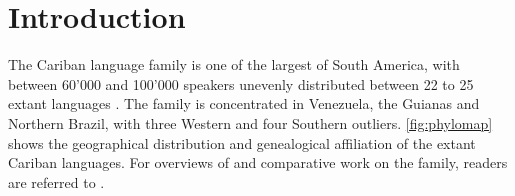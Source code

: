 \section{Introduction}
\label{sec:intro}
The Cariban language family is one of the largest of South America, with between 60'000 and 100'000 speakers unevenly distributed between 22 to 25 extant languages \parencite[441]{gildea2012classification}.
The family is concentrated in Venezuela, the Guianas and Northern Brazil, with three Western and four Southern outliers.
\cref{fig:phylomap} shows the geographical distribution and genealogical affiliation of the extant Cariban languages.
For overviews of and  comparative work on the family, readers are referred to \textcites{gildea1998}{derbyshire1999carib}{meira2002first}{meira2005southern}{meira2006cariban}{gildea2007greenberg}{meira2010origin}{gildea2010story}{gildea2012classification}{matter2021cariban}{gildea2019overview}.






